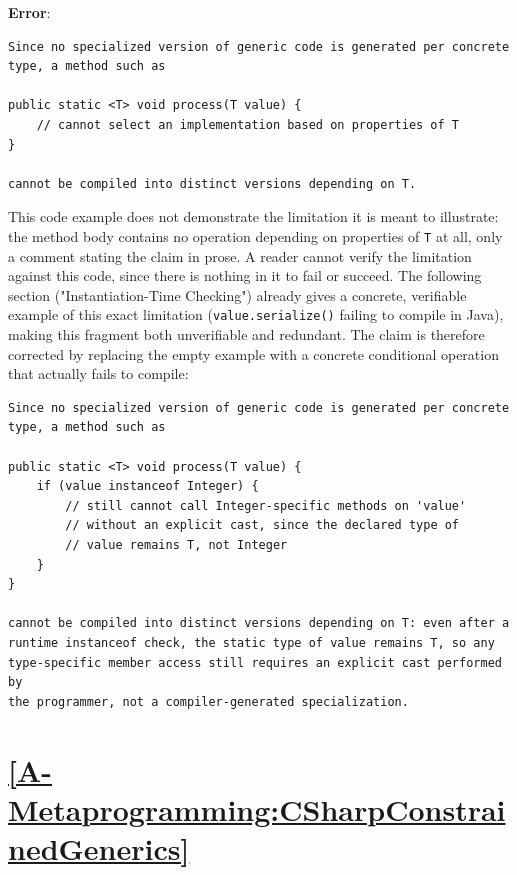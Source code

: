 \documentclass[11pt]{report}
\begin{document}
\noindent\textbf{Error}:

\begin{Verbatim}[breaklines=true]
Since no specialized version of generic code is generated per concrete
type, a method such as

public static <T> void process(T value) {
    // cannot select an implementation based on properties of T
}

cannot be compiled into distinct versions depending on T.
\end{Verbatim}

This code example does not demonstrate the limitation it is meant to
illustrate: the method body contains no operation depending on properties
of \texttt{T} at all, only a comment stating the claim in prose. A reader
cannot verify the limitation against this code, since there is nothing in
it to fail or succeed. The following section ("Instantiation-Time
Checking") already gives a concrete, verifiable example of this exact
limitation (\texttt{value.serialize()} failing to compile in Java), making
this fragment both unverifiable and redundant. The claim is therefore
corrected by replacing the empty example with a concrete conditional
operation that actually fails to compile:

\begin{Verbatim}[breaklines=true]
Since no specialized version of generic code is generated per concrete
type, a method such as

public static <T> void process(T value) {
    if (value instanceof Integer) {
        // still cannot call Integer-specific methods on 'value'
        // without an explicit cast, since the declared type of
        // value remains T, not Integer
    }
}

cannot be compiled into distinct versions depending on T: even after a
runtime instanceof check, the static type of value remains T, so any
type-specific member access still requires an explicit cast performed by
the programmer, not a compiler-generated specialization.
\end{Verbatim}

\section*{\hyperref[A-Metaprogramming:CSharpConstrainedGenerics]{\ref*{A-Metaprogramming:CSharpConstrainedGenerics} }}
\end{document}
